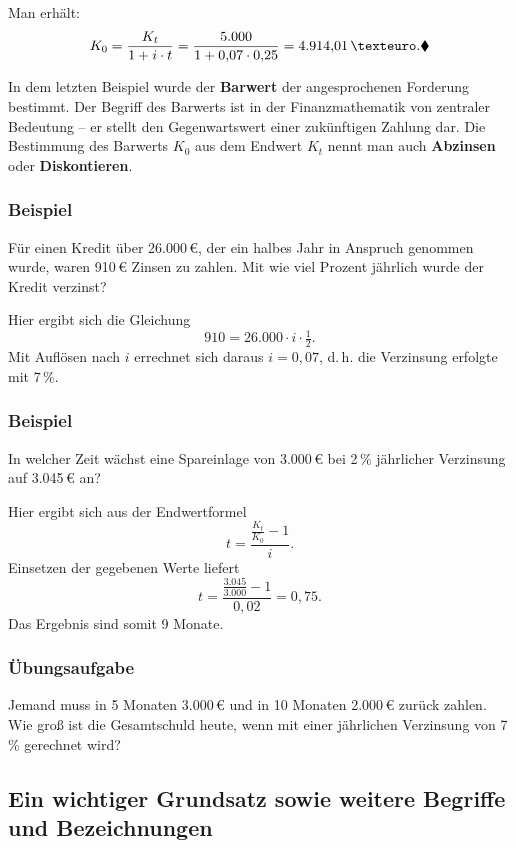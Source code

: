Man erhält:
\[ K_0 = \frac{K_t}{1 + i \cdot t} = \frac{5.000}{1 + 0{,}07 \cdot 0{,}25} = 4.914{,}01\,€ .\beispielende \]

In dem letzten Beispiel wurde der \textbf{Barwert} der angesprochenen Forderung bestimmt. Der Begriff des Barwerts ist in der Finanzmathematik von zentraler Bedeutung -- er stellt den Gegenwartswert einer zukünftigen Zahlung dar. Die Bestimmung des Barwerts $K_0$ aus dem Endwert $K_t$ nennt man auch \textbf{Abzinsen} oder \textbf{Diskontieren}.

\subsubsection{Beispiel}

Für einen Kredit über 26.000\,€, der ein halbes Jahr in Anspruch genommen wurde, waren 910\,€ Zinsen zu zahlen. Mit wie viel Prozent jährlich wurde der Kredit verzinst?

Hier ergibt sich die Gleichung
\[ 910 = 26.000 \cdot i \cdot \tfrac{1}{2} . \]
Mit Auflösen nach $i$ errechnet sich daraus $i = 0{,}07$, d.\,h. die Verzinsung erfolgte mit 7\,\%.\beispielende

\subsubsection{Beispiel}

In welcher Zeit wächst eine Spareinlage von 3.000\,€ bei 2\,\% jährlicher Verzinsung auf 3.045\,€ an?

Hier ergibt sich aus der Endwertformel
\[ t = \frac{\frac{K_t}{K_0} - 1}{i} . \]
Einsetzen der gegebenen Werte liefert
\[ t = \frac{\frac{3.045}{3.000} - 1}{0{,}02} = 0{,}75 . \]
Das Ergebnis sind somit 9 Monate.\beispielende

\subsubsection{Übungsaufgabe}

\begin{graukasten}
  Jemand muss in 5 Monaten 3.000\,€ und in 10 Monaten 2.000\,€ zurück zahlen. Wie groß ist die Gesamtschuld heute, wenn mit einer jährlichen Verzinsung von 7\,\% gerechnet wird?
\end{graukasten}

\subsection{Ein wichtiger Grundsatz sowie weitere Begriffe und Bezeichnungen}


